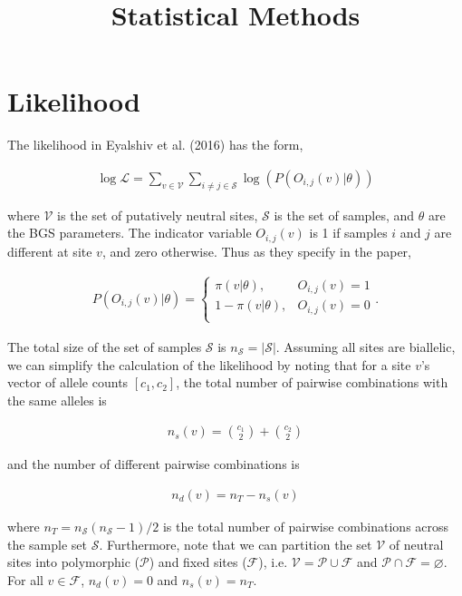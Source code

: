 \documentclass[11pt]{article}
\title{Statistical Methods}
\begin{document}
\maketitle


\section*{Likelihood}

The likelihood in Eyalshiv et al. (2016) has the form,

\begin{align}
  \log\mathcal{L} = \sum_{v \in \mathcal{V}} \sum_{i \ne j \in \mathcal{S}} \log(P(O_{i,j}(v) | \theta))
\end{align}

where $\mathcal{V}$ is the set of putatively neutral sites, $\mathcal{S}$ is
the set of samples, and $\theta$ are the BGS parameters. The indicator variable
$O_{i,j}(v)$ is 1 if samples $i$ and $j$ are different at site $v$, and zero
otherwise. Thus as they specify in the paper, 

\begin{align}
  P(O_{i,j}(v) | \theta) = 
    \begin{cases}
      \pi(v | \theta), & O_{i,j}(v) = 1 \\
      1-\pi(v | \theta), & O_{i,j}(v) = 0 \\
    \end{cases}.
\end{align}

The total size of the set of samples $\mathcal{S}$ is $n_\mathcal{S} =
|\mathcal{S}|$. Assuming all sites are biallelic, we can simplify the
calculation of the likelihood by noting that for a site $v$'s vector of allele
counts $[c_1, c_2]$, the total number of pairwise combinations with the same
alleles is

\begin{align}
  n_s(v) = {c_1 \choose 2} + {c_2 \choose 2}
\end{align}

and the number of different pairwise combinations is 

\begin{align}
  n_d(v) = n_T - n_s(v)
\end{align}

where $n_T = n_\mathcal{S} (n_\mathcal{S} - 1) / 2$  is the total number of
pairwise combinations across the sample set $\mathcal{S}$. Furthermore, note
that we can partition the set $\mathcal{V}$ of neutral sites into polymorphic
($\mathcal{P}$) and fixed sites ($\mathcal{F}$), i.e. $\mathcal{V} =
\mathcal{P} \cup \mathcal{F}$ and $\mathcal{P} \cap \mathcal{F} = \varnothing$.
For all $v \in \mathcal{F}$, $n_d(v) = 0$ and $n_s(v) = n_T$.
\end{document}
